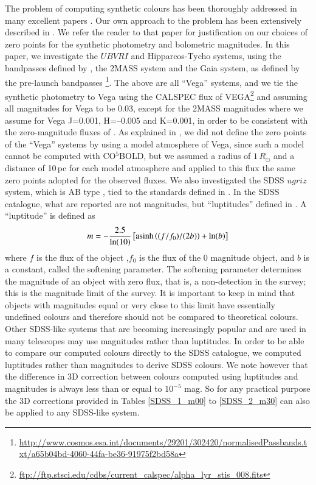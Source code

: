 \documentclass[]{aa}
\newcommand{\cobold}{{\sf CO$^5$BOLD}}
\begin{document}
The problem of computing synthetic colours
has been thoroughly addressed 
in many excellent papers
\citep[e.g.][]{Bessel98,Castelli99,onehag,CK06,BM12,Casagrande14}.
Our own approach to the problem has been extensively described
in \citet{Bonifacio_Mem}.
We refer the reader to that paper for justification on our choices of 
zero points for the synthetic photometry and bolometric magnitudes.
In this paper, we investigate the $UBVRI$ and Hipparcos-Tycho systems, 
using the bandpasses defined by \citet{BM12}, the 2MASS system
\citep{Cohen}  and the Gaia system, as defined by the pre-launch
bandpasses \footnote{\url{http://www.cosmos.esa.int/documents/29201/302420/normalisedPassbands.txt/a65b04bd-4060-44fa-be36-91975f2bd58a}}.
The above are all ``Vega'' systems, and we tie the synthetic photometry
to Vega using the CALSPEC flux of VEGA\footnote{\url{ftp://ftp.stsci.edu/cdbs/current_calspec/alpha_lyr_stis_008.fits}}
and assuming all magnitudes for Vega to be 0.03, except for the 2MASS
magnitudes where we assume for Vega J=0.001, H=--0.005 and K=0.001,
in order to be consistent with the zero-magnitude fluxes of \citet[][see table \ref{2mass}]{Cohen}. 
As explained in  \citet{Bonifacio_Mem}, we did not define the zero points
of the ``Vega'' systems by using a model atmosphere of Vega,
since such a model cannot be computed with \cobold , but we
assumed a radius of $1\,R_\odot$ and a distance of 10\,pc
for each model atmosphere and applied to this flux the same
zero points adopted for the observed fluxes. 
We also investigated the SDSS $ugriz$ system, which  is  AB type 
\citep{OkeGunn83}, tied to the standards defined in \citet{Fukugita}.
In the SDSS catalogue, what are reported are  not magnitudes, 
but  ``luptitudes'' defined in \citet{Lupton}.
A ``luptitude'' is defined as
\begin{equation}
m = -{2.5\over\ln(10)}\left[{\rm asinh}\left((f/f_0)/(2b)\right)+\ln(b)\right]
\label{luptitude}
\end{equation}
where $f$ is the flux of the object ,$f_0$ is the flux
of the 0 magnitude object, and $b$ is a constant, called the softening
parameter. 
The softening parameter determines the magnitude 
of an object with zero flux, that is, a non-detection in the survey; this is
 the magnitude limit of the survey. 
It is important to keep in mind that objects with magnitudes
equal or very close to this limit have essentially undefined
colours and therefore should not be compared to theoretical colours.
Other SDSS-like systems that are becoming increasingly
popular and are used in many telescopes may use magnitudes rather than luptitudes.
In order to be able to compare our computed colours directly to the SDSS catalogue, 
we computed luptitudes rather than magnitudes to derive SDSS  colours. 
We note however that the difference in 3D correction between colours computed
using luptitudes and magnitudes is always less than or equal to $10^{-5}$ mag.
So for any practical purpose the 3D corrections provided in Tables \ref{SDSS_1_m00}
to \ref{SDSS_2_m30} can also be applied to any SDSS-like system.
\end{document}
